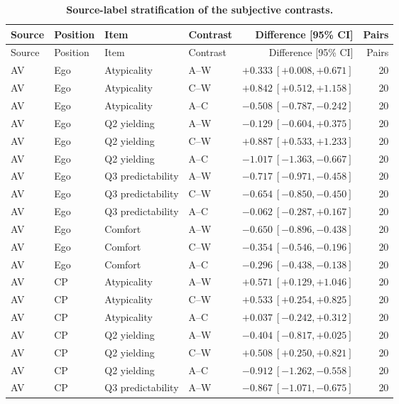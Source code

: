 \begingroup\scriptsize
\setlength{\tabcolsep}{4pt}
\renewcommand{\arraystretch}{1.1}
\begin{longtable}{llllrr}
\caption{\textbf{Source-label stratification of the subjective contrasts.}}\label{tab:subjective_source}\\
\toprule
Source & Position & Item & Contrast & Difference [95\% CI] & Pairs \\
\midrule
\endfirsthead
\toprule
Source & Position & Item & Contrast & Difference [95\% CI] & Pairs \\
\midrule
\endhead
\bottomrule
\endfoot
AV & Ego & Atypicality & A--W & $+0.333\ [+0.008,+0.671]$ & 20 \\
AV & Ego & Atypicality & C--W & $+0.842\ [+0.512,+1.158]$ & 20 \\
AV & Ego & Atypicality & A--C & $-0.508\ [-0.787,-0.242]$ & 20 \\
AV & Ego & Q2 yielding & A--W & $-0.129\ [-0.604,+0.375]$ & 20 \\
AV & Ego & Q2 yielding & C--W & $+0.887\ [+0.533,+1.233]$ & 20 \\
AV & Ego & Q2 yielding & A--C & $-1.017\ [-1.363,-0.667]$ & 20 \\
AV & Ego & Q3 predictability & A--W & $-0.717\ [-0.971,-0.458]$ & 20 \\
AV & Ego & Q3 predictability & C--W & $-0.654\ [-0.850,-0.450]$ & 20 \\
AV & Ego & Q3 predictability & A--C & $-0.062\ [-0.287,+0.167]$ & 20 \\
AV & Ego & Comfort & A--W & $-0.650\ [-0.896,-0.438]$ & 20 \\
AV & Ego & Comfort & C--W & $-0.354\ [-0.546,-0.196]$ & 20 \\
AV & Ego & Comfort & A--C & $-0.296\ [-0.438,-0.138]$ & 20 \\
AV & CP & Atypicality & A--W & $+0.571\ [+0.129,+1.046]$ & 20 \\
AV & CP & Atypicality & C--W & $+0.533\ [+0.254,+0.825]$ & 20 \\
AV & CP & Atypicality & A--C & $+0.037\ [-0.242,+0.312]$ & 20 \\
AV & CP & Q2 yielding & A--W & $-0.404\ [-0.817,+0.025]$ & 20 \\
AV & CP & Q2 yielding & C--W & $+0.508\ [+0.250,+0.821]$ & 20 \\
AV & CP & Q2 yielding & A--C & $-0.912\ [-1.262,-0.558]$ & 20 \\
AV & CP & Q3 predictability & A--W & $-0.867\ [-1.071,-0.675]$ & 20 \\

\end{longtable}
